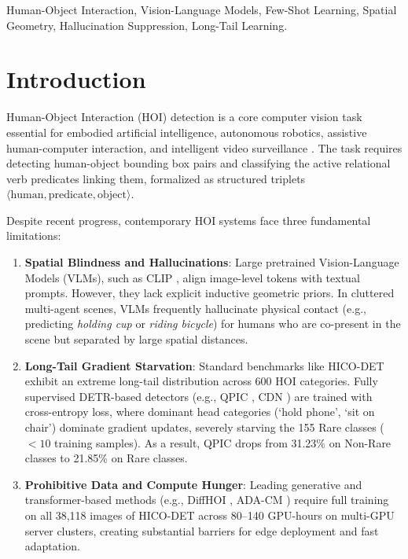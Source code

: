 \documentclass[conference]{IEEEtran}
\begin{document}
\begin{IEEEkeywords}
Human-Object Interaction, Vision-Language Models, Few-Shot Learning, Spatial Geometry, Hallucination Suppression, Long-Tail Learning.
\end{IEEEkeywords}

\section{Introduction}
Human-Object Interaction (HOI) detection is a core computer vision task essential for embodied artificial intelligence, autonomous robotics, assistive human-computer interaction, and intelligent video surveillance \cite{gao2018ican, li2019tin}. The task requires detecting human-object bounding box pairs and classifying the active relational verb predicates linking them, formalized as structured triplets $\langle \text{human}, \text{predicate}, \text{object} \rangle$.

Despite recent progress, contemporary HOI systems face three fundamental limitations:
\begin{enumerate}
    \item \textbf{Spatial Blindness and Hallucinations}: Large pretrained Vision-Language Models (VLMs), such as CLIP \cite{radford2021clip}, align image-level tokens with textual prompts. However, they lack explicit inductive geometric priors. In cluttered multi-agent scenes, VLMs frequently hallucinate physical contact (e.g., predicting \textit{holding cup} or \textit{riding bicycle}) for humans who are co-present in the scene but separated by large spatial distances.
    \item \textbf{Long-Tail Gradient Starvation}: Standard benchmarks like HICO-DET \cite{chao2018hicodet} exhibit an extreme long-tail distribution across 600 HOI categories. Fully supervised DETR-based detectors (e.g., QPIC \cite{tamura2021qpic}, CDN \cite{zhang2021cdn}) are trained with cross-entropy loss, where dominant head categories (`hold phone', `sit on chair') dominate gradient updates, severely starving the 155 Rare classes ($<10$ training samples). As a result, QPIC drops from 31.23\% on Non-Rare classes to 21.85\% on Rare classes.
    \item \textbf{Prohibitive Data and Compute Hunger}: Leading generative and transformer-based methods (e.g., DiffHOI \cite{wang2023diffhoi}, ADA-CM \cite{liu2024adacm}) require full training on all 38,118 images of HICO-DET across 80--140 GPU-hours on multi-GPU server clusters, creating substantial barriers for edge deployment and fast adaptation.
\end{enumerate}
\end{document}
